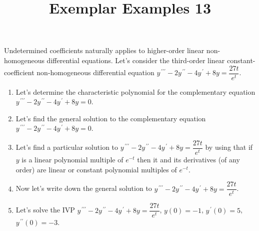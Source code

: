 \documentclass{ximera}
\begin{document}
\begin{abstract}
 \end{abstract}

    \title{Exemplar Examples 13}
    
    \maketitle

Undetermined coefficients naturally applies to higher-order linear non-homogeneous differential equations.  Let's consider the third-order linear constant-coefficient non-homogeneous differential equation $y^{\,\prime\prime\prime}-2y^{\,\prime\prime}-4y^{\,\prime}+8y=\dfrac{27t}{e^t}$.

\begin{enumerate}
\item Let's determine the characteristic polynomial for the complementary equation $y^{\,\prime\prime\prime}-2y^{\,\prime\prime}-4y^{\,\prime}+8y=0$.

\vfill





\item Let's find the general solution to the complementary equation \\$y^{\,\prime\prime\prime}-2y^{\,\prime\prime}-4y^{\,\prime}+8y=0$.


\vfill


\newpage

\item Let's find a particular solution to $y^{\,\prime\prime\prime}-2y^{\,\prime\prime}-4y^{\,\prime}+8y=\dfrac{27t}{e^t}$ by using that if $y$ is a linear polynomial multiple of $e^{-t}$ then it and its derivatives (of any order) are linear or constant polynomial multiples of $e^{-t}$.


\vfill

\item Now let's write down the general solution to $y^{\,\prime\prime\prime}-2y^{\,\prime\prime}-4y^{\,\prime}+8y=\dfrac{27t}{e^t}$.


\vspace{3cm}


\item Let's solve the IVP $y^{\,\prime\prime\prime}-2y^{\,\prime\prime}-4y^{\,\prime}+8y=\dfrac{27t}{e^t}$, $y(0)=-1$, $y^{\,\prime}(0)=5$, $y^{\,\prime\prime}(0)=-3$.






\vfill


\end{enumerate}
\end{document}
